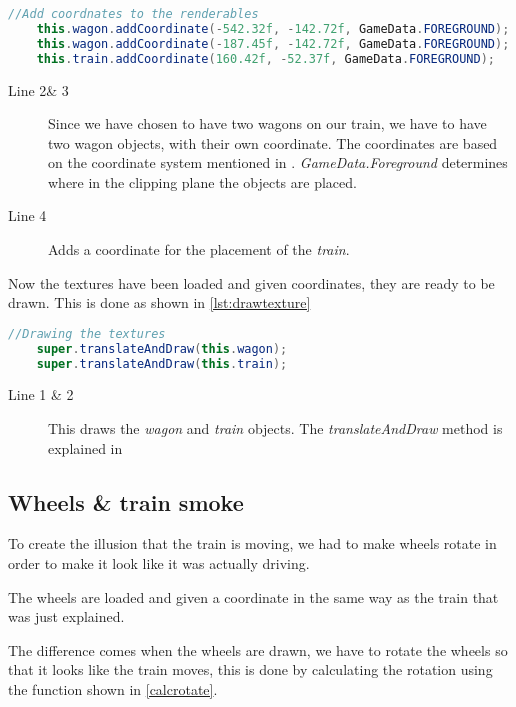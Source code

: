 \begin{lstlisting}[language=java,firstnumber=1,caption={Placing the texture on the screen},label=lst:addcoordinate] 
	//Add coordnates to the renderables
	this.wagon.addCoordinate(-542.32f, -142.72f, GameData.FOREGROUND);
	this.wagon.addCoordinate(-187.45f, -142.72f, GameData.FOREGROUND);
	this.train.addCoordinate(160.42f, -52.37f, GameData.FOREGROUND);
\end{lstlisting}

\begin{description}
\item[Line 2\& 3] Since we have chosen to have two wagons on our train, we have to have two wagon objects, with their own coordinate. The coordinates are based on the coordinate system mentioned in . \textit{GameData.Foreground} determines where in the clipping plane the objects are placed. 
\item[Line 4] Adds a coordinate for the placement of the \textit{train}.
\end{description}

Now the textures have been loaded and given coordinates, they are ready to be drawn. This is done as shown in \autoref{lst:drawtexture}

\begin{lstlisting}[language=java,firstnumber=1,caption={Drawing the texture on the screen},label=lst:drawtexture] 
	//Drawing the textures
	super.translateAndDraw(this.wagon);
	super.translateAndDraw(this.train);
\end{lstlisting}

\begin{description}
\item[Line 1 \& 2] This draws the \textit{wagon} and \textit{train} objects. The \textit{translateAndDraw} method is explained in 
\end{description}

\subsection{Wheels \& train smoke}

To create the illusion that the train is moving, we had to make wheels rotate in order to make it look like it was actually driving. 

The wheels are loaded and given a coordinate in the same way as the train that was just explained.

The difference comes when the wheels are drawn, we have to rotate the wheels so that it looks like the train moves, this is done by calculating the rotation using the function shown in \autoref{calcrotate}.


